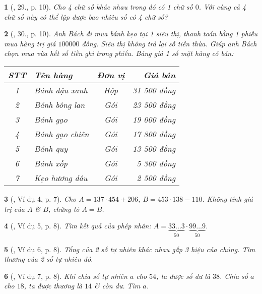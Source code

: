 \documentclass{article}
\newtheorem{baitoan}{}
\begin{document}
\begin{baitoan}[\cite{Tuyen_Toan_6}, 29., p. 10]
	Cho 4 chữ số khác nhau trong đó có 1 chữ số $0$. Với cùng cả 4 chữ số này có thể lập được bao nhiêu số có 4 chữ số?
\end{baitoan}

\begin{baitoan}[\cite{Tuyen_Toan_6}, 30., p. 10]
	Anh Bách đi mua bánh kẹo tại 1 siêu thị, thanh toán bằng 1 phiếu mua hàng trị giá $100000$ đồng. Siêu thị không trả lại số tiền thừa. Giúp anh Bách chọn mua vừa hết số tiền ghi trong phiếu. Bảng giá 1 số mặt hàng có bán:
	\begin{table}[H]
		\centering
		\begin{tabular}{|c|l|c|r|}
			\hline
			STT & Tên hàng & Đơn vị & Giá bán \\
			\hline
			1 & Bánh đậu xanh & Hộp & 31 500 đồng \\
			\hline
			2 & Bánh bông lan & Gói & 23 500 đồng \\
			\hline
			3 & Bánh gạo & Gói & 19 000 đồng \\
			\hline
			4 & Bánh gạo chiên & Gói & 17 800 đồng \\
			\hline
			5 & Bánh quy & Gói & 13 500 đồng \\
			\hline
			6 & Bánh xốp & Gói & 5 300 đồng \\
			\hline
			7 & Kẹo hương dâu & Gói & 2 500 đồng \\
			\hline
		\end{tabular}
	\end{table}
\end{baitoan}

\begin{baitoan}[\cite{Binh_Toan_6_tap_1}, Ví dụ 4, p. 7]
	Cho $A = 137\cdot454 + 206$, $B = 453\cdot138 - 110$. Không tính giá trị của $A$ \& $B$, chứng tỏ $A = B$.
\end{baitoan}

\begin{baitoan}[\cite{Binh_Toan_6_tap_1}, Ví dụ 5, p. 8]
	Tìm kết quả của phép nhân: $A = \underbrace{33\ldots3}_{50}\cdot\underbrace{99\ldots9}_{50}$.
\end{baitoan}

\begin{baitoan}[\cite{Binh_Toan_6_tap_1}, Ví dụ 6, p. 8]
	Tổng của 2 số tự nhiên khác nhau gấp 3 hiệu của chúng. Tìm thương của 2 số tự nhiên đó.
\end{baitoan}

\begin{baitoan}[\cite{Binh_Toan_6_tap_1}, Ví dụ 7, p. 8]
	Khi chia số tự nhiên $a$ cho $54$, ta được số dư là $38$. Chia số $a$ cho $18$, ta được thương là $14$ \& còn dư. Tìm $a$.
\end{baitoan}
\end{document}
